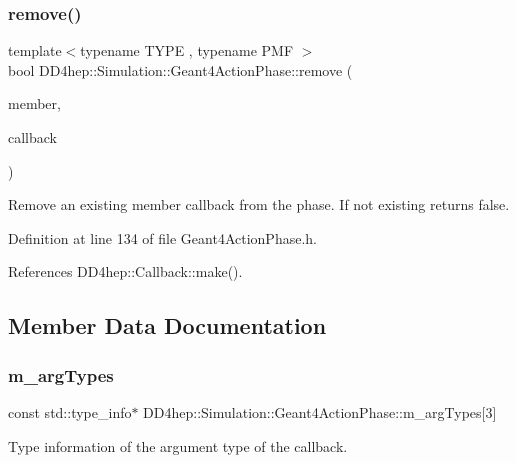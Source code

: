 \subsubsection{\texorpdfstring{remove()}{remove()}\hspace{0.1cm}{\footnotesize\ttfamily [3/3]}}
{\footnotesize\ttfamily template$<$typename T\+Y\+PE , typename P\+MF $>$ \\
bool D\+D4hep\+::\+Simulation\+::\+Geant4\+Action\+Phase\+::remove (\begin{DoxyParamCaption}\item[{T\+Y\+PE $\ast$}]{member,  }\item[{P\+MF}]{callback }\end{DoxyParamCaption})\hspace{0.3cm}{\ttfamily [inline]}}



Remove an existing member callback from the phase. If not existing returns false. 



Definition at line 134 of file Geant4\+Action\+Phase.\+h.



References D\+D4hep\+::\+Callback\+::make().



\subsection{Member Data Documentation}
\hypertarget{class_d_d4hep_1_1_simulation_1_1_geant4_action_phase_a92e33c1a9f3cdbd49cf3b31a61213f57}{}\label{class_d_d4hep_1_1_simulation_1_1_geant4_action_phase_a92e33c1a9f3cdbd49cf3b31a61213f57} 
\subsubsection{\texorpdfstring{m\+\_\+arg\+Types}{m\_argTypes}}
{\footnotesize\ttfamily const std\+::type\+\_\+info$\ast$ D\+D4hep\+::\+Simulation\+::\+Geant4\+Action\+Phase\+::m\+\_\+arg\+Types\mbox{[}3\mbox{]}\hspace{0.3cm}{\ttfamily [protected]}}



Type information of the argument type of the callback. 



